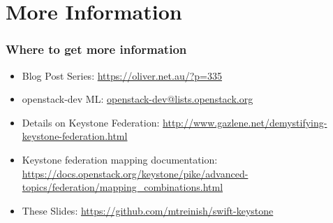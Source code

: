 \documentclass[aspectratio=169,11pt,hyperref={colorlinks=true}]{beamer}
\begin{document}
\section{More Information}
\begin{frame}
\frametitle{Where to get more information}
    \begin{itemize}
        \item Blog Post Series: \href{https://oliver.net.au/?p=335}{https://oliver.net.au/?p=335}
        \item openstack-dev ML: \href{mailto:openstack-dev@lists.openstack.org}{openstack-dev@lists.openstack.org}
        \item Details on Keystone Federation: \href{http://www.gazlene.net/demystifying-keystone-federation.html}{http://www.gazlene.net/demystifying-keystone-federation.html}
        \item Keystone federation mapping documentation: \href{https://docs.openstack.org/keystone/pike/advanced-topics/federation/mapping\_combinations.html}{https://docs.openstack.org/keystone/pike/advanced-topics/federation/mapping\_combinations.html}
        \item These Slides: \href{https://github.com/mtreinish/swift-keystone}{https://github.com/mtreinish/swift-keystone}
   \end{itemize}
\end{frame}
\end{document}
